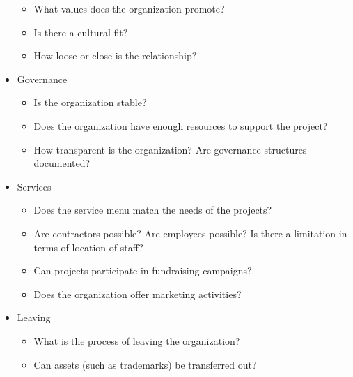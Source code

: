 \begin{itemize}
\begin{itemize}
\item What values does the organization promote?

\item Is there a cultural fit?

\item How loose or close is the relationship?

\end{itemize}

\item Governance

\begin{itemize}

\item Is the organization stable?

\item Does the organization have enough resources to support the project?

\item How transparent is the organization?  Are governance structures documented?

\end{itemize}

\item Services

\begin{itemize}

\item Does the service menu match the needs of the projects?

\item Are contractors possible?  Are employees possible?  Is there a limitation in terms of location of staff?

\item Can projects participate in fundraising campaigns?

\item Does the organization offer marketing activities?

\end{itemize}

\item Leaving

\begin{itemize}

\item What is the process of leaving the organization?

\item Can assets (such as trademarks) be transferred out?

\end{itemize}

\end{itemize}

